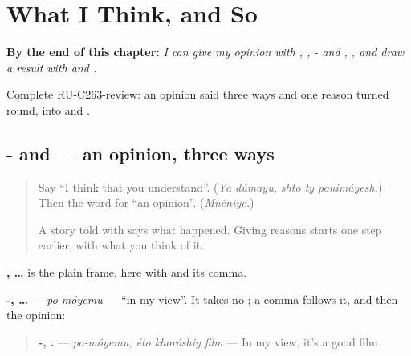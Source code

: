
\chapter{What I Think, and So}
\label{ch:ru-what-i-think-and-so}

\begin{chapteropening}
\textbf{By the end of this chapter:} \emph{I can give my opinion with  , , - and  , , and draw a result with  and  .}

Complete RU-C263-review: an opinion said three ways and one reason turned round,   into  and  .
\end{chapteropening}

\section[\texorpdfstring{\ru{я} \ru{думаю}, \ru{что} … … (ya dúmayu, shto …)}{я думаю, что … … (ya dúmayu, shto …)}]{- and   — an opinion, three ways}

\label{lesson:RU-C263-po-moemu}



\begin{quote}
Say \textquotedblleft{}I think that you understand\textquotedblright{}. (\emph{Ya dúmayu, shto ty ponimáyesh.}) Then the word for \textquotedblleft{}an opinion\textquotedblright{}. (\emph{Mnéniye.})

A story told with \emph{} says what happened. Giving reasons starts one step earlier, with what you think of it.
\end{quote}

\begin{grammarlens}[title={Grammar Lens: three frames}]
\textbf{ ,  …} is the plain frame, here with \textbf{} and its comma.

\textbf{-, …} — \emph{po-móyemu} — \textquotedblleft{}in my view\textquotedblright{}. It takes no \emph{}; a comma follows it, and then the opinion:

\begin{quote}
\textbf{-,   .} — \emph{po-móyemu, éto khoróshiy film} — In my view, it's a good film.
\end{quote}
\end{grammarlens}

